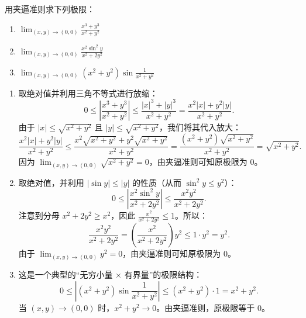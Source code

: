\documentclass[lang=cn,11pt]{elegantbook}
\begin{document}
\begin{exercise}
用夹逼准则求下列极限：
\begin{enumerate}
  \item[(1)] $\displaystyle\lim_{(x,y)\to(0,0)}\frac{x^3+y^3}{x^2+y^2}$
  \item[(2)] $\displaystyle\lim_{(x,y)\to(0,0)}\frac{x^2\sin^2y}{x^2+2y^2}$
  \item[(3)] $\displaystyle\lim_{(x,y)\to(0,0)}(x^2+y^2)\sin\frac1{x^2+y^2}$
\end{enumerate}
\end{exercise}
\begin{solution}
\begin{enumerate}
  \item[(1)] 取绝对值并利用三角不等式进行放缩：
  \[
  0 \leqslant  \left| \frac{x^3+y^3}{x^2+y^2} \right| \leqslant  \frac{|x|^3+|y|^3}{x^2+y^2} = \frac{x^2|x|+y^2|y|}{x^2+y^2}.
  \]
  由于 $|x| \leqslant  \sqrt{x^2+y^2}$ 且 $|y| \leqslant  \sqrt{x^2+y^2}$，我们将其代入放大：
  \[
  \frac{x^2|x|+y^2|y|}{x^2+y^2} \leqslant  \frac{x^2\sqrt{x^2+y^2}+y^2\sqrt{x^2+y^2}}{x^2+y^2} = \frac{(x^2+y^2)\sqrt{x^2+y^2}}{x^2+y^2} = \sqrt{x^2+y^2}.
  \]
  因为 $\lim_{(x,y)\to(0,0)}\sqrt{x^2+y^2}=0$，由夹逼准则可知原极限为 $0$。

  \item[(2)] 取绝对值，并利用 $|\sin y| \leqslant  |y|$ 的性质（从而 $\sin^2 y \leqslant  y^2$）：
  \[
  0 \leqslant  \left| \frac{x^2\sin^2y}{x^2+2y^2} \right| \leqslant  \frac{x^2 y^2}{x^2+2y^2}.
  \]
  注意到分母 $x^2+2y^2 \geq x^2$，因此 $\frac{x^2}{x^2+2y^2} \leqslant  1$。所以：
  \[
  \frac{x^2 y^2}{x^2+2y^2} = \left(\frac{x^2}{x^2+2y^2}\right)y^2 \leqslant  1 \cdot y^2 = y^2.
  \]
  由于 $\lim_{(x,y)\to(0,0)}y^2 = 0$，由夹逼准则可知原极限为 $0$。

  \item[(3)] 这是一个典型的“无穷小量 $\times$ 有界量”的极限结构：
  \[
  0 \leqslant  \left| (x^2+y^2)\sin\frac1{x^2+y^2} \right| \leqslant  (x^2+y^2) \cdot 1 = x^2+y^2.
  \]
  当 $(x,y)\to(0,0)$ 时，$x^2+y^2 \to 0$。由夹逼准则，原极限等于 $0$。
\end{enumerate}
\end{solution}
\end{document}
